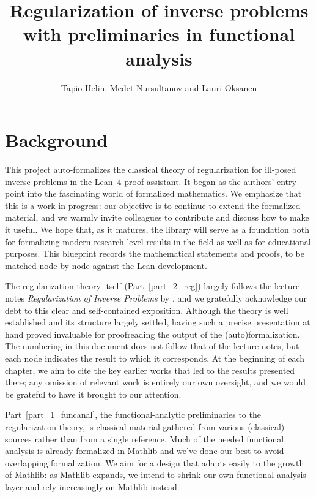 \documentclass[a4paper]{report}
\title{Regularization of inverse problems with preliminaries in functional analysis}
\author{Tapio Helin, Medet Nursultanov and Lauri Oksanen}
\theoremstyle{plain}
\theoremstyle{definition}
\theoremstyle{remark}
\begin{document}
\maketitle

\chapter*{Background}

This project auto-formalizes the classical theory of regularization for ill-posed inverse problems in the Lean~4 proof assistant. It began as the authors' entry point into the fascinating world of formalized mathematics. We emphasize that this is a work in progress: our objective is to continue to extend the formalized material, and we warmly invite colleagues to contribute and discuss how to make it useful. We hope that, as it matures, the library will serve as a foundation both for formalizing modern research-level results in the field as well as for educational purposes. This blueprint records the mathematical statements and proofs, to be matched node by node against the Lean development.

The regularization theory itself (Part~\ref{part_2_reg}) largely follows the lecture notes \emph{Regularization of Inverse Problems} by \citet{Clason2021}, and we gratefully acknowledge our debt to this clear and self-contained exposition. Although the theory is well established and its structure largely settled, having such a precise presentation at hand proved invaluable for proofreading the output of the (auto)formalization. The numbering in this document does not follow that of the lecture notes, but each node indicates the result to which it corresponds. At the beginning of each chapter, we aim to cite the key earlier works that led to the results presented there; any omission of relevant work is entirely our own oversight, and we would be grateful to have it brought to our attention.

Part~\ref{part_1_funcanal}, the functional-analytic preliminaries to the regularization
theory, is classical material gathered from various (classical) sources rather than from
a single reference. Much of the needed functional analysis is already formalized in Mathlib and we've done our best to avoid overlapping formalization. We aim for a design that adapts easily to the growth of Mathlib: as Mathlib expands, we intend to shrink our own functional analysis layer and rely increasingly on Mathlib instead.
\end{document}
